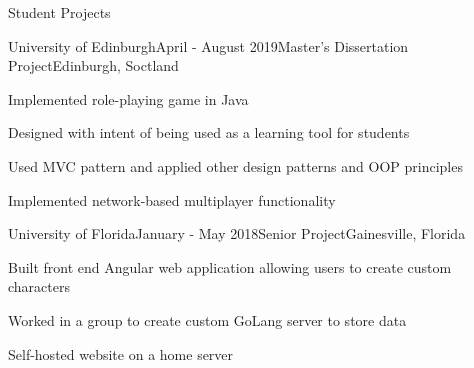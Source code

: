 \documentclass[
	11pt, %
]{resume} %
\begin{document}
\begin{rSection}{Student Projects}

	\begin{rSubsection}{University of Edinburgh}{April - August 2019}{Master's Dissertation Project}{Edinburgh, Soctland}
		\item Implemented role-playing game in Java
		\item Designed with intent of being used as a learning tool for students
		\item Used MVC pattern and applied other design patterns and OOP principles
		\item Implemented network-based multiplayer functionality
	\end{rSubsection}


	\begin{rSubsection}{University of Florida}{January - May 2018}{Senior Project}{Gainesville, Florida}
		\item Built front end Angular web application allowing users to create custom characters
		\item Worked in a group to create custom GoLang server to store data
		\item Self-hosted website on a home server
	\end{rSubsection}

\end{rSection}
\end{document}
